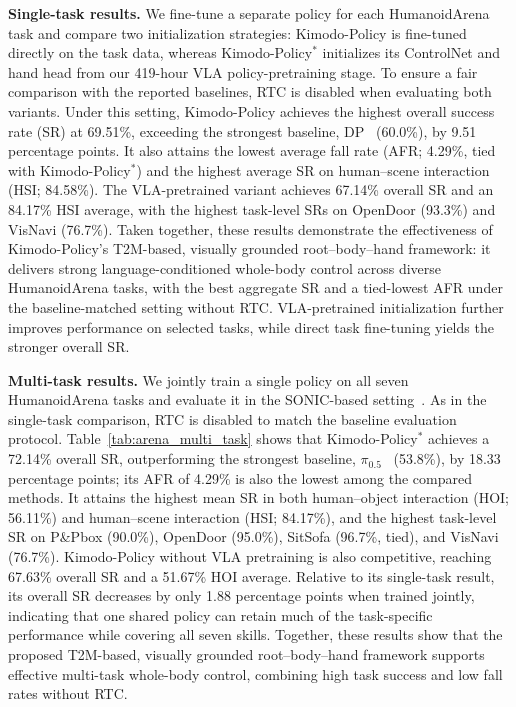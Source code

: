 \textbf{Single-task results.} We fine-tune a separate policy for each HumanoidArena task and compare two initialization strategies: Kimodo-Policy is fine-tuned directly on the task data, whereas Kimodo-Policy$^{*}$ initializes its ControlNet and hand head from our 419-hour VLA policy-pretraining stage. To ensure a fair comparison with the reported baselines, RTC is disabled when evaluating both variants. Under this setting, Kimodo-Policy achieves the highest overall success rate (SR) at 69.51\%, exceeding the strongest baseline, DP~\cite{chi2023diffusionpolicy} (60.0\%), by 9.51 percentage points. It also attains the lowest average fall rate (AFR; 4.29\%, tied with Kimodo-Policy$^{*}$) and the highest average SR on human--scene interaction (HSI; 84.58\%). The VLA-pretrained variant achieves 67.14\% overall SR and an 84.17\% HSI average, with the highest task-level SRs on OpenDoor (93.3\%) and VisNavi (76.7\%). Taken together, these results demonstrate the effectiveness of Kimodo-Policy's T2M-based, visually grounded root--body--hand framework: it delivers strong language-conditioned whole-body control across diverse HumanoidArena tasks, with the best aggregate SR and a tied-lowest AFR under the baseline-matched setting without RTC. VLA-pretrained initialization further improves performance on selected tasks, while direct task fine-tuning yields the stronger overall SR.



\textbf{Multi-task results.} We jointly train a single policy on all seven HumanoidArena tasks and evaluate it in the SONIC-based setting~\cite{humanoidarena,sonic}. As in the single-task comparison, RTC is disabled to match the baseline evaluation protocol. Table~\ref{tab:arena_multi_task} shows that Kimodo-Policy$^{*}$ achieves a 72.14\% overall SR, outperforming the strongest baseline, $\pi_{0.5}$~\cite{pi05} (53.8\%), by 18.33 percentage points; its AFR of 4.29\% is also the lowest among the compared methods. It attains the highest mean SR in both human--object interaction (HOI; 56.11\%) and human--scene interaction (HSI; 84.17\%), and the highest task-level SR on P\&Pbox (90.0\%), OpenDoor (95.0\%), SitSofa (96.7\%, tied), and VisNavi (76.7\%). Kimodo-Policy without VLA pretraining is also competitive, reaching 67.63\% overall SR and a 51.67\% HOI average. Relative to its single-task result, its overall SR decreases by only 1.88 percentage points when trained jointly, indicating that one shared policy can retain much of the task-specific performance while covering all seven skills. Together, these results show that the proposed T2M-based, visually grounded root--body--hand framework supports effective multi-task whole-body control, combining high task success and low fall rates without RTC.

